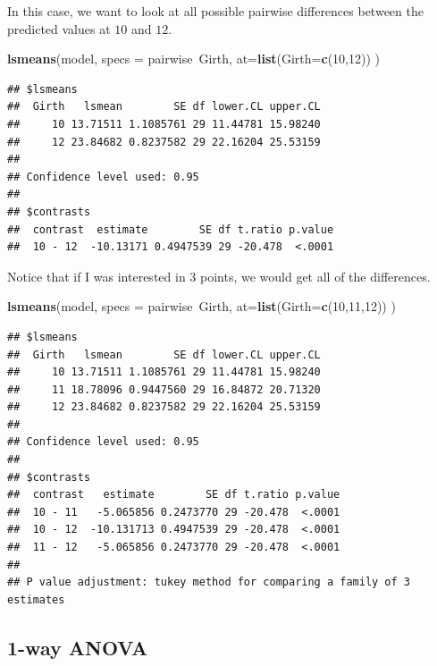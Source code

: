 \documentclass[]{book}
\newenvironment{Shaded}{\begin{snugshade}}{\end{snugshade}}
\newcommand{\KeywordTok}[1]{\textcolor[rgb]{0.13,0.29,0.53}{\textbf{{#1}}}}
\newcommand{\DataTypeTok}[1]{\textcolor[rgb]{0.13,0.29,0.53}{{#1}}}
\newcommand{\DecValTok}[1]{\textcolor[rgb]{0.00,0.00,0.81}{{#1}}}
\newcommand{\NormalTok}[1]{{#1}}
\theoremstyle{definition}
\theoremstyle{definition}
\theoremstyle{remark}
\begin{document}
In this case, we want to look at all possible pairwise differences
between the predicted values at \(10\) and \(12\).

\begin{Shaded}
\begin{Highlighting}[]
\KeywordTok{lsmeans}\NormalTok{(model, }\DataTypeTok{specs =} \NormalTok{pairwise~Girth,}
        \DataTypeTok{at=}\KeywordTok{list}\NormalTok{(}\DataTypeTok{Girth=}\KeywordTok{c}\NormalTok{(}\DecValTok{10}\NormalTok{,}\DecValTok{12}\NormalTok{)) ) }
\end{Highlighting}
\end{Shaded}

\begin{verbatim}
## $lsmeans
##  Girth   lsmean        SE df lower.CL upper.CL
##     10 13.71511 1.1085761 29 11.44781 15.98240
##     12 23.84682 0.8237582 29 22.16204 25.53159
## 
## Confidence level used: 0.95 
## 
## $contrasts
##  contrast  estimate        SE df t.ratio p.value
##  10 - 12  -10.13171 0.4947539 29 -20.478  <.0001
\end{verbatim}

Notice that if I was interested in 3 points, we would get all of the
differences.

\begin{Shaded}
\begin{Highlighting}[]
\KeywordTok{lsmeans}\NormalTok{(model, }\DataTypeTok{specs =} \NormalTok{pairwise~Girth,}
        \DataTypeTok{at=}\KeywordTok{list}\NormalTok{(}\DataTypeTok{Girth=}\KeywordTok{c}\NormalTok{(}\DecValTok{10}\NormalTok{,}\DecValTok{11}\NormalTok{,}\DecValTok{12}\NormalTok{)) ) }
\end{Highlighting}
\end{Shaded}

\begin{verbatim}
## $lsmeans
##  Girth   lsmean        SE df lower.CL upper.CL
##     10 13.71511 1.1085761 29 11.44781 15.98240
##     11 18.78096 0.9447560 29 16.84872 20.71320
##     12 23.84682 0.8237582 29 22.16204 25.53159
## 
## Confidence level used: 0.95 
## 
## $contrasts
##  contrast   estimate        SE df t.ratio p.value
##  10 - 11   -5.065856 0.2473770 29 -20.478  <.0001
##  10 - 12  -10.131713 0.4947539 29 -20.478  <.0001
##  11 - 12   -5.065856 0.2473770 29 -20.478  <.0001
## 
## P value adjustment: tukey method for comparing a family of 3 estimates
\end{verbatim}

\subsection{1-way ANOVA}\label{way-anova-1}
\end{document}
